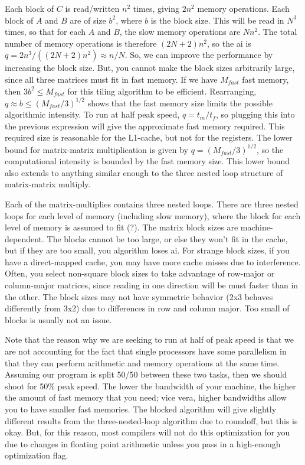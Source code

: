 \documentclass[10pt]{article}
\begin{document}
\begin{flushleft}
\begin{enumerate}
Each block of \(C\) is read/written \(n^2\) times, giving \(2n^2\) memory operations. Each block of \(A\) and \(B\) are of size \(b^2\), where \(b\) is the block size. This will be read in \(N^3\) times, so that for each \(A\) and \(B\), the slow memory operations are \(Nn^2\). The total number of memory operations is therefore \((2N+2)n^2\), so the \gls{ai} is \(q=2n^3/((2N+2)n^2)\approx n/N\). So, we can improve the performance by increasing the block size. But, you cannot make the block sizes arbitrarily large, since all three matrices must fit in fast memory. If we have \(M_{fast}\) fast memory, then \(3b^2\leq M_{fast}\) for this tiling algorithm to be efficient. Rearranging, \(q\approx b\leq (M_{fast}/3)^{1/2}\) shows that the fast memory size limits the possible algorithmic intensity. To run at half peak speed, \(q=t_m/t_f\), so plugging this into the previous expression will give the approximate fast memory required. This required size is reasonable for the L1-cache, but not for the registers. The lower bound for matrix-matrix multiplication is given by \(q=(M_{fast}/3)^{1/2}\), so the computational intensity is bounded by the fast memory size. This lower bound also extends to anything similar enough to the three nested loop structure of matrix-matrix multiply.

Each of the matrix-multiplies contains three nested loops. There are three nested loops for each level of memory (including slow memory), where the block for each level of memory is assumed to fit (?). The matrix block sizes are machine-dependent. The blocks cannot be too large, or else they won't fit in the cache, but if they are too small, you algorithm loses \gls{ai}. For strange block sizes, if you have a direct-mapped cache, you may have more cache misses due to interference. Often, you select non-square block sizes to take advantage of row-major or column-major matrices, since reading in one direction will be must faster than in the other. The block sizes may not have symmetric behavior (2x3 behaves differently from 3x2) due to differences in row and column major. Too small of blocks is usually not an issue.

Note that the reason why we are seeking to run at half of peak speed is that we are not accounting for the fact that single processors have some parallelism in that they can perform arithmetic and memory operations at the same time. Assuming our program is split 50/50 between these two tasks, then we should shoot for 50\% peak speed. The lower the bandwidth of your machine, the higher the amount of fast memory that you need; vice vera, higher bandwidths allow you to have smaller fast memories. The blocked algorithm will give slightly different results from the three-nested-loop algorithm due to roundoff, but this is okay. But, for this reason, most compilers will not do this optimization for you due to changes in floating point arithmetic unless you pass in a high-enough optimization flag.


\end{enumerate}
\end{flushleft}
\end{document}
